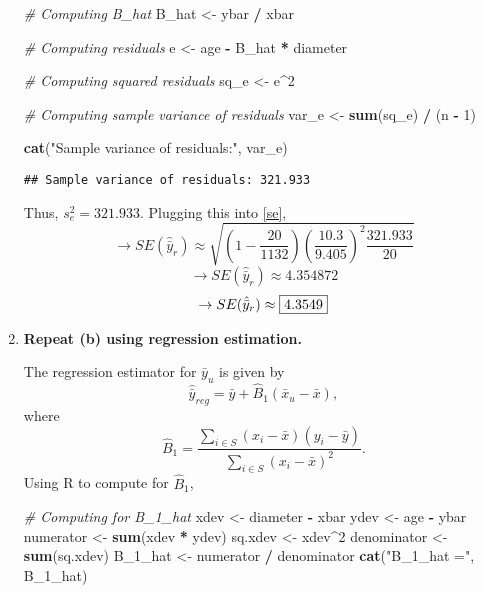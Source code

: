 \documentclass[]{article}
\newenvironment{Shaded}{\begin{snugshade}}{\end{snugshade}}
\newcommand{\CommentTok}[1]{\textcolor[rgb]{0.56,0.35,0.01}{\textit{#1}}}
\newcommand{\DecValTok}[1]{\textcolor[rgb]{0.00,0.00,0.81}{#1}}
\newcommand{\FunctionTok}[1]{\textcolor[rgb]{0.13,0.29,0.53}{\textbf{#1}}}
\newcommand{\NormalTok}[1]{#1}
\newcommand{\OtherTok}[1]{\textcolor[rgb]{0.56,0.35,0.01}{#1}}
\newcommand{\SpecialCharTok}[1]{\textcolor[rgb]{0.81,0.36,0.00}{\textbf{#1}}}
\newcommand{\StringTok}[1]{\textcolor[rgb]{0.31,0.60,0.02}{#1}}
\begin{document}
\begin{enumerate}[label=(\alph*)]
\begin{Shaded}
\begin{Highlighting}[]
\CommentTok{\# Computing B\_hat}
\NormalTok{B\_hat }\OtherTok{\textless{}{-}}\NormalTok{ ybar }\SpecialCharTok{/}\NormalTok{ xbar}

\CommentTok{\# Computing residuals }
\NormalTok{e }\OtherTok{\textless{}{-}}\NormalTok{ age }\SpecialCharTok{{-}}\NormalTok{ B\_hat }\SpecialCharTok{*}\NormalTok{ diameter}

\CommentTok{\# Computing squared residuals}
\NormalTok{sq\_e }\OtherTok{\textless{}{-}}\NormalTok{ e}\SpecialCharTok{\^{}}\DecValTok{2}

\CommentTok{\# Computing sample variance of residuals}
\NormalTok{var\_e }\OtherTok{\textless{}{-}} \FunctionTok{sum}\NormalTok{(sq\_e) }\SpecialCharTok{/}\NormalTok{ (n }\SpecialCharTok{{-}} \DecValTok{1}\NormalTok{)}

\FunctionTok{cat}\NormalTok{(}\StringTok{"Sample variance of residuals:"}\NormalTok{, var\_e)}
\end{Highlighting}
\end{Shaded}

\begin{verbatim}
## Sample variance of residuals: 321.933
\end{verbatim}

Thus, $s_e^2 = 321.933$. Plugging this into \eqref{se}, 
\[
\rightarrow SE( \hat{\bar y}_r) \approx \sqrt{\left(1-\frac{20}{1132}\right)\left(\frac{10.3}{9.405}\right)^2\frac{321.933}{20}}
\]
\[
\rightarrow SE( \hat{\bar y}_r) \approx 4.354872
\]
\[
\rightarrow SE( \hat{\bar y}_r) \approx \fbox{4.3549}
\]

\item \textbf{Repeat (b) using regression estimation.}

The regression estimator for $\bar y_u$ is given by 
\[
\hat{\bar y}_{reg} = \bar y + \hat B_1(\bar x_u - \bar x), \tag{3} \label{yreg} 
\]
where 
\[
\hat B_1 = \frac{\sum_{i \in S}(x_i - \bar x)(y_i - \bar y)}{\sum_{i \in S}(x_i-\bar x)^2}.
\]
Using R to compute for $\hat B_1$,


\begin{Shaded}
\begin{Highlighting}[]
\CommentTok{\# Computing for B\_1\_hat}
\NormalTok{xdev }\OtherTok{\textless{}{-}}\NormalTok{ diameter }\SpecialCharTok{{-}}\NormalTok{ xbar}
\NormalTok{ydev }\OtherTok{\textless{}{-}}\NormalTok{ age }\SpecialCharTok{{-}}\NormalTok{ ybar}
\NormalTok{numerator }\OtherTok{\textless{}{-}} \FunctionTok{sum}\NormalTok{(xdev }\SpecialCharTok{*}\NormalTok{ ydev)}
\NormalTok{sq.xdev }\OtherTok{\textless{}{-}}\NormalTok{ xdev}\SpecialCharTok{\^{}}\DecValTok{2}
\NormalTok{denominator }\OtherTok{\textless{}{-}} \FunctionTok{sum}\NormalTok{(sq.xdev)}
\NormalTok{B\_1\_hat }\OtherTok{\textless{}{-}}\NormalTok{ numerator }\SpecialCharTok{/}\NormalTok{ denominator}
\FunctionTok{cat}\NormalTok{(}\StringTok{"B\_1\_hat ="}\NormalTok{, B\_1\_hat)}
\end{Highlighting}
\end{Shaded}


\end{enumerate}
\end{document}
